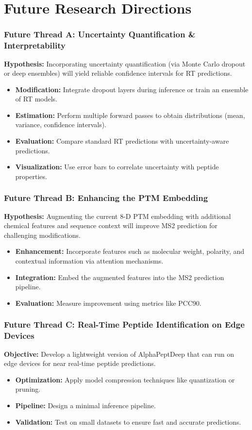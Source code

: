 \documentclass{beamer}
\begin{document}
\section{Future Research Directions}
\begin{frame}
  \frametitle{Future Thread A: Uncertainty Quantification \& Interpretability}
  \textbf{Hypothesis:} Incorporating uncertainty quantification (via Monte Carlo dropout or deep ensembles) will yield reliable confidence intervals for RT predictions.
  \begin{itemize}
    \item \textbf{Modification:} Integrate dropout layers during inference or train an ensemble of RT models.
    \item \textbf{Estimation:} Perform multiple forward passes to obtain distributions (mean, variance, confidence intervals).
    \item \textbf{Evaluation:} Compare standard RT predictions with uncertainty-aware predictions.
    \item \textbf{Visualization:} Use error bars to correlate uncertainty with peptide properties.
  \end{itemize}
\end{frame}

\begin{frame}
  \frametitle{Future Thread B: Enhancing the PTM Embedding}
  \textbf{Hypothesis:} Augmenting the current 8-D PTM embedding with additional chemical features and sequence context will improve MS2 prediction for challenging modifications.
  \begin{itemize}
    \item \textbf{Enhancement:} Incorporate features such as molecular weight, polarity, and contextual information via attention mechanisms.
    \item \textbf{Integration:} Embed the augmented features into the MS2 prediction pipeline.
    \item \textbf{Evaluation:} Measure improvement using metrics like PCC90.
  \end{itemize}
\end{frame}

\begin{frame}
  \frametitle{Future Thread C: Real-Time Peptide Identification on Edge Devices}
  \textbf{Objective:} Develop a lightweight version of AlphaPeptDeep that can run on edge devices for near real-time peptide predictions.
  \begin{itemize}
    \item \textbf{Optimization:} Apply model compression techniques like quantization or pruning.
    \item \textbf{Pipeline:} Design a minimal inference pipeline.
    \item \textbf{Validation:} Test on small datasets to ensure fast and accurate predictions.
  \end{itemize}
\end{frame}
\end{document}
